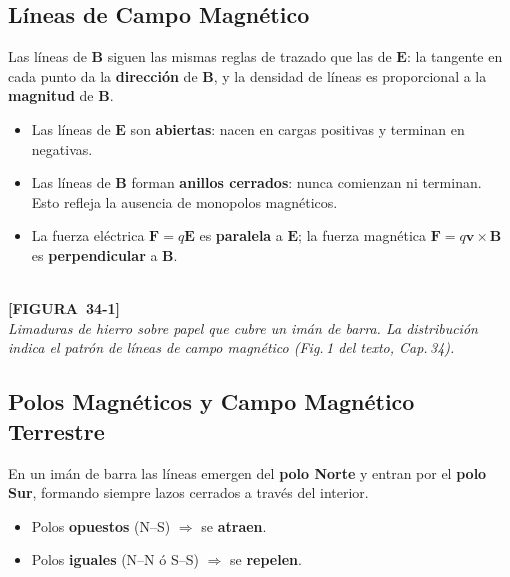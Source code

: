 \documentclass[12pt, letterpaper]{report}
\numberwithin{equation}{section}
\newcommand{\vB}[1]{\boldsymbol{#1}}          %
\newcommand{\figplaceholder}[2]{%
  \begin{tcolorbox}[figbox]
    \centering
    \textcolor{NavyBlue!50}{\rule{0pt}{2.8cm}}\\[4pt]
    {\small\color{NavyBlue}\textbf{[FIGURA\ #1]}\\[2pt]
    \textit{#2}}
  \end{tcolorbox}
}
\begin{document}
\subsection{Líneas de Campo Magnético}

Las líneas de $\vB{B}$ siguen las mismas reglas de trazado que las de
$\vB{E}$: la tangente en cada punto da la \textbf{dirección} de $\vB{B}$,
y la densidad de líneas es proporcional a la \textbf{magnitud} de $\vB{B}$.

\begin{tcolorbox}[propbox, title=Diferencia fundamental respecto a las líneas de $\vB{E}$]
  \begin{itemize}[leftmargin=1.5em, itemsep=2pt]
    \item Las líneas de $\vB{E}$ son \textbf{abiertas}: nacen en cargas
          positivas y terminan en negativas.
    \item Las líneas de $\vB{B}$ forman \textbf{anillos cerrados}: nunca
          comienzan ni terminan. Esto refleja la ausencia de monopolos
          magnéticos.
    \item La fuerza eléctrica $\vB{F}=q\vB{E}$ es \textbf{paralela} a
          $\vB{E}$; la fuerza magnética
          $\vB{F}=q\vB{v}\times\vB{B}$ es \textbf{perpendicular} a
          $\vB{B}$.
  \end{itemize}
\end{tcolorbox}

\figplaceholder{34-1}{Limaduras de hierro sobre papel que cubre un imán de barra.
La distribución indica el patrón de líneas de campo magnético
(Fig.\,1 del texto, Cap.\,34).}

\subsection{Polos Magnéticos y Campo Magnético Terrestre}

En un imán de barra las líneas emergen del \textbf{polo Norte} y entran por el
\textbf{polo Sur}, formando siempre lazos cerrados a través del interior.

\begin{itemize}[leftmargin=1.8em, itemsep=2pt]
  \item Polos \textbf{opuestos} (N–S) $\Rightarrow$ se \textbf{atraen}.
  \item Polos \textbf{iguales} (N–N ó S–S) $\Rightarrow$ se \textbf{repelen}.
\end{itemize}
\end{document}
